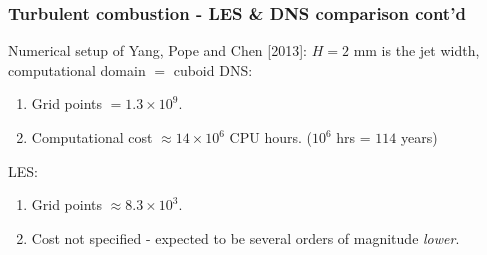 \documentclass{beamer}
\begin{document}

\begin{frame}%
\frametitle{Turbulent combustion - LES \& DNS comparison cont'd}
Numerical setup of Yang, Pope and Chen [2013]:\newline
\tiny{$H = 2$ mm is the jet width, computational domain $=$ cuboid}\newline
\scriptsize
DNS: 
\begin{enumerate}[(1)]
\scriptsize
\item Grid points $ = 1.3 \times 10^9$.  
\item Computational cost $\approx 14 \times 10^6$ CPU hours. ($10^6$ hrs = $114$ years)
\end{enumerate}
LES:
\begin{enumerate}[(1)]
\scriptsize
\item Grid points $ \approx 8.3 \times 10^3$.  
\item Cost not specified - expected to be several orders of magnitude \textit{lower}.
\end{enumerate}
\vspace{0pt}

\begin{minipage}[0.5\textheight]{\textwidth}
\begin{columns}[T]
\hspace{-10pt}
\begin{column}{0.7\textwidth}
\vspace{-20pt}
\begin{figure}
\centering
{}
\end{figure}



\end{column}
\end{columns}
\end{minipage}
\end{frame}
\end{document}
